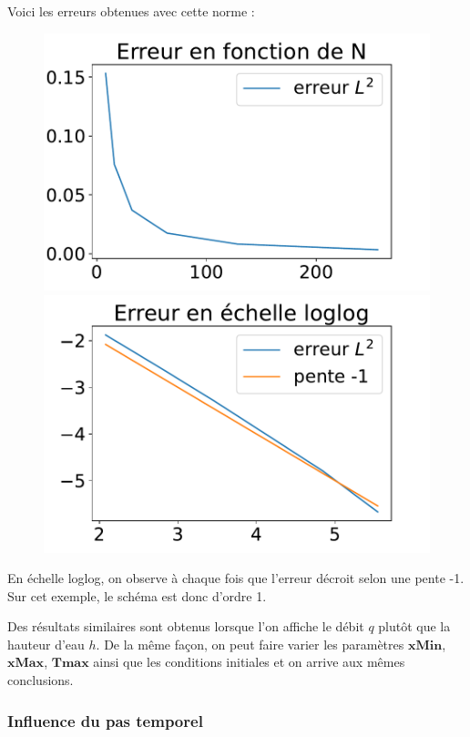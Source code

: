 \documentclass[
11pt, %
francais, %
singlespacing, %
headsepline, %
f%
]{MastersDoctoralThesis} %
\theoremstyle{definition}
\begin{document}
Voici les erreurs obtenues avec cette norme :

\begin{figure}
\includegraphics[scale = .6]{erreurL2}
\includegraphics[scale = .6]{erreurL2loglog} 
\end{figure}

En échelle loglog, on observe à chaque fois que l'erreur décroit selon une pente -1. Sur cet exemple, le schéma est donc d'ordre 1.

Des résultats similaires sont obtenus lorsque l'on affiche le débit $q$ plutôt que la hauteur d'eau $h$. De la même fa\c con, on peut faire varier les paramètres $\textbf{xMin}$, $\textbf{xMax}$, $\textbf{Tmax}$ ainsi que les conditions initiales et on arrive aux mêmes conclusions.

\subsubsection{Influence du pas temporel}
\end{document}
